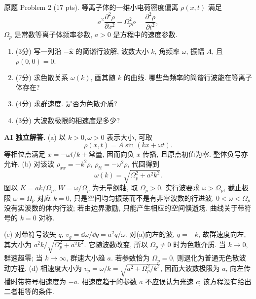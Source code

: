 \begin{exercise}\label{exam:actual2.2}
原题 Problem 2 (17 pts). 等离子体的一维小电荷密度偏离 $\rho(x,t)$ 满足
\[
a^2\frac{\partial^2\rho}{\partial x^2}-\Omega_p^2\rho=\frac{\partial^2\rho}{\partial t^2},
\]
$\Omega_p$ 是常数等离子体频率参数, $a>0$ 是方程中的速度参数.
\begin{enumerate}[label=\alph*.]
\item (3分) 写一列沿 $-\hat{\mathbf x}$ 的简谐行波解, 波数大小 $k$, 角频率 $\omega$, 振幅 $A$, 且 $\rho(0,0)=0$.
\item (7分) 求色散关系 $\omega(k)$, 画其随 $k$ 的曲线. 哪些角频率的简谐行波能在等离子体存在?
\item (4分) 求群速度. 是否为色散介质?
\item (3分) 大波数极限的相速度是多少?
\end{enumerate}
\end{exercise}
\begin{solution}
\textbf{AI 独立解答.}
(a) 以 $k>0,\omega>0$ 表示大小, 可取
\[
\rho(x,t)=A\sin(kx+\omega t).
\]
等相位点满足 $x=-\omega t/k+\text{常量}$, 因而向负 $x$ 传播, 且原点初值为零. 整体负号亦允许.
(b) 对该波 $\rho_{xx}=-k^2\rho$, $\rho_{tt}=-\omega^2\rho$, 代回得到
\[
\boxed{\omega(k)=\sqrt{\Omega_p^2+a^2k^2}}.
\]
图以 $K=ak/\Omega_p$, $W=\omega/\Omega_p$ 为无量纲轴, 取 $\Omega_p>0$. 实行波要求 $\omega>\Omega_p$, 截止极限 $\omega=\Omega_p$ 对应 $k=0$, 只是空间均匀振荡而不是有非零波数的行进波. $0<\omega<\Omega_p$ 没有实波数的体内行波; 若由边界激励, 只能产生相应的空间倏逝场. 曲线关于带符号的 $k=0$ 对称.
\begin{center}\end{center}
(c) 对带符号波矢 $q$, $v_g=\dd\omega/\dd q=a^2q/\omega$. 对(a)向左的波, $q=-k$, 故群速度向左, 其大小为 $a^2k/\sqrt{\Omega_p^2+a^2k^2}$. 它随波数改变, 所以 $\Omega_p\ne0$ 时为色散介质. 当 $k\to0$, 群速趋零; 当 $k\to\infty$, 群速大小趋 $a$. 若参数恰为 $\Omega_p=0$, 则退化为普通无色散波动方程.
(d) 相速度大小为 $v_p=\omega/k=\sqrt{a^2+\Omega_p^2/k^2}$, 因而大波数极限为 $a$, 向左传播时带符号相速度为 $-a$. 相速度趋于的参数 $a$ 不应误认为光速 $c$; 该方程没有给出二者相等的条件.
\end{solution}

